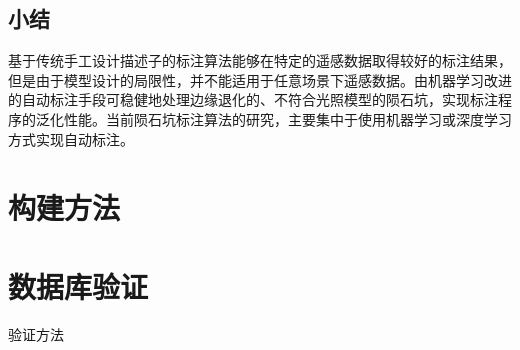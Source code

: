 \documentclass{article}
\begin{document}
\subsection{小结}
基于传统手工设计描述子的标注算法能够在特定的遥感数据取得较好的标注结果，但是由于模型设计的局限性，并不能适用于任意场景下遥感数据。由机器学习改进的自动标注手段可稳健地处理边缘退化的、不符合光照模型的陨石坑，实现标注程序的泛化性能。当前陨石坑标注算法的研究，主要集中于使用机器学习或深度学习方式实现自动标注。
\section{构建方法}
\section{数据库验证}
验证方法
\newpage
\printbibliography[heading=bibliography,title=参考文献]
\end{document}
